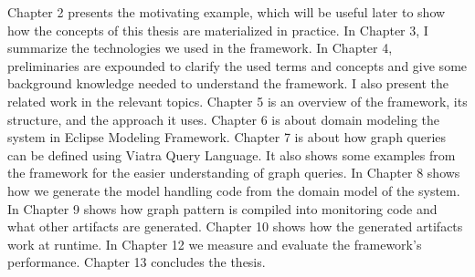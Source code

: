 Chapter 2 presents the motivating example, which will be useful later to show how the concepts of this thesis are materialized in practice.
In Chapter 3, I summarize the technologies we used in the framework.
In Chapter 4, preliminaries are expounded to clarify the used terms and concepts and give some background knowledge needed to understand the framework. I also present the related work in the relevant topics.
Chapter 5 is an overview of the framework, its structure, and the approach it uses.
Chapter 6 is about domain modeling the system in Eclipse Modeling Framework.
Chapter 7 is about how graph queries can be defined using Viatra Query Language. It also shows some examples from the framework for the easier understanding of graph queries.
In Chapter 8 shows how we generate the model handling code from the domain model of the system.
In Chapter 9 shows how graph pattern is compiled into monitoring code and what other artifacts are generated. 
Chapter 10 shows how the generated artifacts work at runtime. 
In Chapter 12 we measure and evaluate the framework's performance.
Chapter 13 concludes the thesis.


